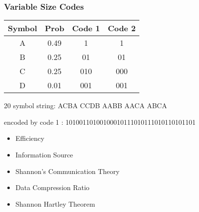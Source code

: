 \begin{frame}
\frametitle{Variable Size Codes}
\begin{center}
\begin{tabular}{|c|c|c|c|}\hline
Symbol &Prob &Code 1&Code 2 \\ \hline \hline
A  & 0.49 & 1 & 1 \\ \hline
B  & 0.25 & 01  & 01 \\ \hline
C  & 0.25 & 010 & 000  \\ \hline
D  & 0.01 & 001       &  001       \\ \hline
\end{tabular}
\end{center}

20 symbol string: ACBA CCDB AABB AACA ABCA

encoded by code 1 : 10100110100100010111010111010110101101
\end{frame}
\begin{frame}
\begin{itemize}
\item Efficiency
\item Information Source
\item Shannon's Communication Theory
\item Data Compression Ratio
\item Shannon Hartley Theorem
\end{itemize}
\end{frame}

